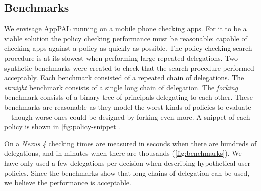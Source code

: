 \documentclass[]{llncs}
\begin{document}
%
%

\subsection{Benchmarks}
\label{ssec:benchmarks}

We envisage AppPAL running on a mobile phone checking apps.
For it to be a viable solution the policy checking performance must be reasonable: capable of checking apps against a policy as quickly as possible.
The policy checking search procedure is at its slowest when performing large repeated delegations.
Two synthetic benchmarks were created to check that the search procedure performed acceptably.
Each benchmark consisted of a repeated chain of delegations.
The \emph{straight} benchmark consists of a single long chain of delegation.
The \emph{forking} benchmark consists of a binary tree of principals delegating to each other.
These benchmarks are reasonable as they model the worst kinds of policies to evaluate---though worse ones could be designed by forking even more.
A snippet of each policy is shown in \autoref{fig:policy-snippet}.

On a \emph{Nexus 4} checking times are measured in seconds when there are hundreds of delegations, and in minutes when there are thousands (\autoref{fig:benchmarks}).
We have only used a few delegations per decision when describing hypothetical user policies.
Since the benchmarks show that long chains of delegation can be used, we believe the performance is acceptable.
\end{document}
